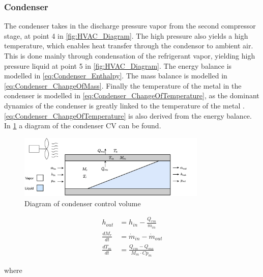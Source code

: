 \subsubsection{Condenser}

The condenser takes in the discharge pressure vapor from the second compressor stage, at point 4 in \cref{fig:HVAC_Diagram}. The high pressure also yields a high temperature,
which enables heat transfer through the condensor to ambient air. This is done mainly through condensation of the refrigerant vapor, yielding high pressure liquid at point 5 in \cref{fig:HVAC_Diagram}.
The energy balance is modelled in \cref{eq:Condenser_Enthalpy}. The mass balance is modelled in \cref{eq:Condenser_ChangeOfMass}. Finally the temperature of the metal in the condenser is modelled in
\cref{eq:Condenser_ChangeOfTemperature}, as the dominant dynamics of the condenser is greatly linked to the temperature of the metal \cite{Sorensen2013}. \cref{eq:Condenser_ChangeOfTemperature} is also
derived from the energy balance. In \cref{fig:condenser_CV} a diagram of the condenser CV can be found.

\begin{figure}[h!]
	\centering
	\includegraphics[width=0.8\textwidth]{Graphics/Condenser.pdf}
	\caption{Diagram of condenser control volume}
	\label{fig:condenser_CV}
\end{figure}

\begin{align}
	h_{out} 			& = h_{in} - \frac{Q_{rm}}{\dot{m}_{in}}  	\label{eq:Condenser_Enthalpy} \\
	\frac{dM_r}{dt} 	& = \dot{m}_{in} - \dot{m}_{out} 				\label{eq:Condenser_ChangeOfMass}\\
	\frac{dT_m}{dt} 	& = \frac{Q_{rm} - Q_{ma}}{M_m \cdot Cp_m}		\label{eq:Condenser_ChangeOfTemperature}
\end{align}

where

